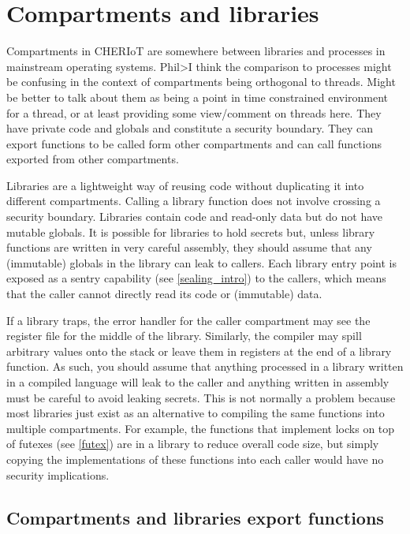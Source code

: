 \chapter[label=compartments]{Compartments and libraries}

Compartments in CHERIoT are somewhere between libraries and processes in mainstream operating systems.
Phil>I think the comparison to processes might be confusing in the context of compartments being orthogonal to threads.  Might be better to talk about them as being a point in time constrained environment for a thread, or at least providing some view/comment on threads here.   
They have private code and globals and constitute a security boundary.
They can export functions to be called form other compartments and can call functions exported from other compartments.

Libraries are a lightweight way of reusing code without duplicating it into different compartments.
Calling a library function does not involve crossing a security boundary.
Libraries contain code and read-only data but do not have mutable globals.
It is possible for libraries to hold secrets but, unless library functions are written in very careful assembly, they should assume that any (immutable) globals in the library can leak to callers.
Each library entry point is exposed as a sentry capability (see \ref{sealing_intro}) to the callers, which means that the caller cannot directly read its code or (immutable) data.

\begin{warning}
If a library traps, the error handler for the caller compartment may see the register file for the middle of the library.
Similarly, the compiler may spill arbitrary values onto the stack or leave them in registers at the end of a library function.
As such, you should assume that anything processed in a library written in a compiled language will leak to the caller and anything written in assembly must be  careful to avoid leaking secrets.
This is not normally a problem because most libraries just exist as an alternative to compiling the same functions into multiple compartments.
For example, the functions that implement locks on top of futexes (see \ref{futex}) are in a library to reduce overall code size, but simply copying the implementations of these functions into each caller would have no security implications.
\end{warning}

\section{Compartments and libraries export functions}

